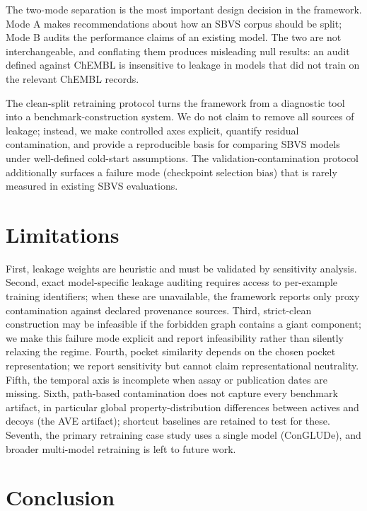 \documentclass[11pt]{article}
\begin{document}
The two-mode separation is the most important design decision in the framework. Mode A makes recommendations about how an SBVS corpus should be split; Mode B audits the performance claims of an existing model. The two are not interchangeable, and conflating them produces misleading null results: an audit defined against ChEMBL is insensitive to leakage in models that did not train on the relevant ChEMBL records.

The clean-split retraining protocol turns the framework from a diagnostic tool into a benchmark-construction system. We do not claim to remove all sources of leakage; instead, we make controlled axes explicit, quantify residual contamination, and provide a reproducible basis for comparing SBVS models under well-defined cold-start assumptions. The validation-contamination protocol additionally surfaces a failure mode (checkpoint selection bias) that is rarely measured in existing SBVS evaluations.

\section{Limitations}

First, leakage weights are heuristic and must be validated by sensitivity analysis. Second, exact model-specific leakage auditing requires access to per-example training identifiers; when these are unavailable, the framework reports only proxy contamination against declared provenance sources. Third, strict-clean construction may be infeasible if the forbidden graph contains a giant component; we make this failure mode explicit and report infeasibility rather than silently relaxing the regime. Fourth, pocket similarity depends on the chosen pocket representation; we report sensitivity but cannot claim representational neutrality. Fifth, the temporal axis is incomplete when assay or publication dates are missing. Sixth, path-based contamination does not capture every benchmark artifact, in particular global property-distribution differences between actives and decoys (the AVE artifact); shortcut baselines are retained to test for these. Seventh, the primary retraining case study uses a single model (ConGLUDe), and broader multi-model retraining is left to future work.

\section{Conclusion}
\end{document}
